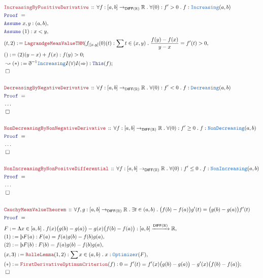 \documentclass[12pt]{scrartcl}
\newcommand{\TYPE}[1]{\textcolor{NavyBlue}{\mathtt{#1}}}
\newcommand{\LOGIC}[1]{\textcolor{Blue}{\mathtt{#1}}}
\newcommand{\THM}[1]{\textcolor{Maroon}{\mathtt{#1}}}
\renewcommand{\.}{\; . \;}
\newcommand{\de}{: \kern 0.1pc =}
\newcommand{\Theorem}[2]{& \THM{#1} \, :: \, #2 \\ & \Proof = \\ }
\newcommand{\Page}[1]{ \begin{align*} #1 \end{align*}   }
\newcommand{ \bd }{ \ByDef }
\newcommand{\NoProof}{ & \ldots \\ \EndProof}
\newcommand{\Reals}{\mathbb{R} }
\newcommand{\Say}[3]{& #1 \de #2 : #3, \\}
\newcommand{\Conclude}[3]{& #1 \de #2 : #3; \\}
\newcommand{\DeriveConclude}[3]{& \leadsto #1 \de #2 : #3 ; \\}
\newcommand{\Assume}[2]{& \LOGIC{Assume} \;#1 : #2, \\}
\newcommand{\QED}{\; \square}
\newcommand{\EndProof}{& \QED \\}
\newcommand{\ByDef}{\eth}
\newcommand{\ByConstr}{\text{\thorn}}
\newcommand{\Proof}{\LOGIC{Proof} \; }
\newcommand{\DIFF}{\mathsf{DIFF}}
\begin{document}
\newpage
\Page{
	\Theorem{IncreasingByPositiveDerivative}{  
	   \forall f : [a,b] \to_{\DIFF(\Reals)} \Reals \. \forall (0) : f' > 0 \. f : \TYPE{Increasing}(a,b)
	}
	\Assume{x,y}{(a,b)}
	\Assume{(1)}{ x < y }
	\Say{(t,2)}{  \THM{LagrandgeMeanValueTHM}(f_{|[x,y]}(0)(t)  }
	{ \sum t \in (x,y) \. \frac{f(y) -f(x)}{y - x} = f'(t) > 0     }
	\Conclude{()}{ (2)(y - x) + f(x) }{f(y) > 0}
	\DeriveConclude{(*)}{\bd^{-1} \TYPE{Increasing}I(\forall)I(\Rightarrow)}
	{
		\LOGIC{This}(f)
	}
	\EndProof
	\\
	\Theorem{DecreasingByNegativeDerivative}{  
	   \forall f : [a,b] \to_{\DIFF(\Reals)} \Reals \. \forall (0) : f' < 0 \. f : \TYPE{Decreasing}(a,b)
	}
	\NoProof
	\\
	\Theorem{NonDecreasingByNonNegativeDerivative}{  
	   \forall f : [a,b] \to_{\DIFF(\Reals)} \Reals \. \forall (0) : f' \ge 0 \. f : \TYPE{NonDecreasing}(a,b)
	}
	\NoProof
	\\
	\Theorem{NonIncreasingByNonPositveDifferential}{  
	   \forall f : [a,b] \to_{\DIFF(\Reals)} \Reals \. \forall (0) : f' \le 0 \. f : \TYPE{NonIncreasing}(a,b)
	}
	\NoProof
	\\
	\Theorem{CauchyMeanValueTheorem}{ \forall f,g : [a,b] \to_{\DIFF(\Reals)} \Reals  
		\. \exists t \in (a,b) \. \big(f(b) - f(a)\big) g'(t) = \big( g(b) - g(a)\big)f'(t)  
	}
	\Say{F}{\Lambda x \in [a,b] \. f(x)\big(g(b) -g(a)\big) - g(x)\big(f(b) -f(a) \big) }
	{
		[a,b] \xrightarrow{\DIFF(\Reals)} \Reals
	}
	\Say{(1)}{\ByConstr F(a)}{F(a) = f(a)g(b) - f(b)g(a)}
	\Say{(2)}{\ByConstr F(b)}{F(b) = f(a)g(b) - f(b)g(a)}
	\Say{(x,3)}{\THM{RolleLemma}(1,2)}{\sum x \in (a,b) \. x : \TYPE{Optimizer}(F)}
	\Conclude{ (*) }{\THM{FirstDerivativeOptimumCriterion}(f)}{
		0 = f'(t) = f'(x)\big( g(b) - g(a)\big) - g'(x)\big( f(b) - f(a)\big) 
		}
	\EndProof
}
\newpage
\end{document}
